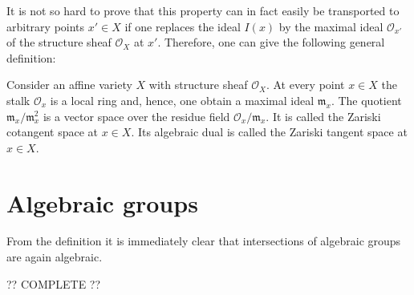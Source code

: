     It is not so hard to prove that this property can in fact easily be transported to arbitrary points $x'\in X$ if one replaces the ideal $I(x)$ by the maximal ideal $\mathcal{O}_{x'}$ of the structure sheaf $\mathcal{O}_X$ at $x'$. Therefore, one can give the following general definition:
    \begin{definition}
        Consider an affine variety $X$ with structure sheaf $\mathcal{O}_X$. At every point $x\in X$ the stalk $\mathcal{O}_x$ is a local ring and, hence, one obtain a maximal ideal $\mathfrak{m}_x$. The quotient $\mathfrak{m}_x/\mathfrak{m}_x^2$ is a vector space over the residue field $\mathcal{O}_x/\mathfrak{m}_x$. It is called the Zariski cotangent space at $x\in X$. Its algebraic dual is called the Zariski tangent space at $x\in X$.
    \end{definition}

\section{Algebraic groups}

    \begin{property}
        From the definition it is immediately clear that intersections of algebraic groups are again algebraic.
    \end{property}

    ?? COMPLETE ??